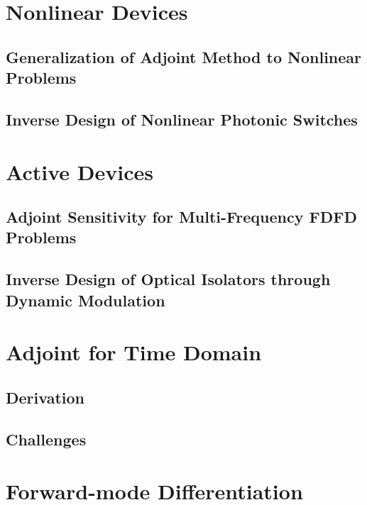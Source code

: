 
\section{Nonlinear Devices}

\subsection{Generalization of Adjoint Method to Nonlinear Problems}

\subsection{Inverse Design of Nonlinear Photonic Switches}

\section{Active Devices}

\subsection{Adjoint Sensitivity for Multi-Frequency FDFD Problems}

\subsection{Inverse Design of Optical Isolators through Dynamic Modulation}

\section{Adjoint for Time Domain}

\subsection{Derivation}

\subsection{Challenges}

\section{Forward-mode Differentiation}
